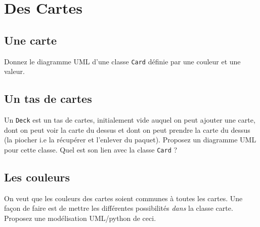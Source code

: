 \documentclass[12pt]{article}
\begin{document}
\section{Des Cartes}
\subsection{Une carte}
Donnez le diagramme UML d'une classe \verb|Card| définie par une couleur et une valeur. 

\subsection{Un tas de cartes}
Un \verb|Deck| est un tas de cartes, initialement vide auquel on peut ajouter une carte, dont on peut voir la carte du
dessus et dont on peut prendre la carte du dessus (la piocher i.e la récupérer et l'enlever du paquet). Proposez un
diagramme UML pour cette classe. Quel est son lien avec la classe \verb|Card| ?

\subsection{Les couleurs}
On veut que les couleurs des cartes soient communes à toutes les cartes. Une façon de faire est de mettre les différentes possibilités {\em dans}  la classe carte. Proposez une modélisation UML/python de ceci. 
\end{document}
